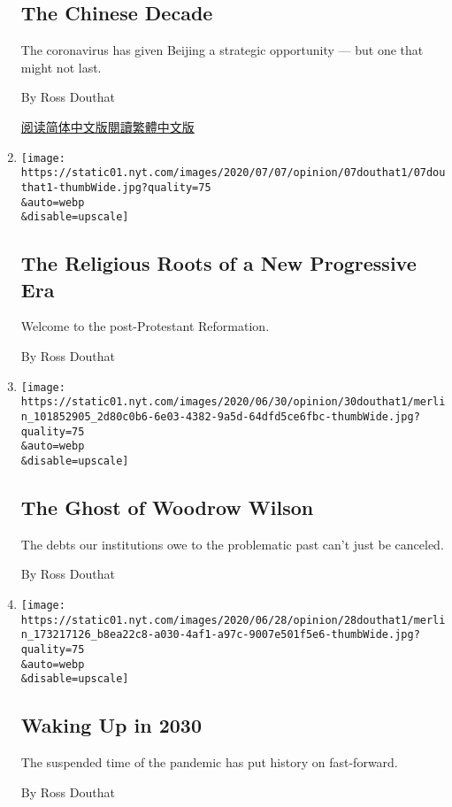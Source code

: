 \begin{enumerate}
{  \subsection{The Chinese Decade}\label{the-chinese-decade}}

  The coronavirus has given Beijing a strategic opportunity --- but one
  that might not last.

  By Ross Douthat

  \href{https://cn.nytimes.com/opinion/20200713/china-coronavirus-power/}{阅读简体中文版}\href{https://cn.nytimes.com/opinion/20200713/china-coronavirus-power/zh-hant/}{閱讀繁體中文版}
\item
  \href{/2020/07/07/opinion/protestant-progressive-reformation.html}{}

  \texttt{[image: https://static01.nyt.com/images/2020/07/07/opinion/07douthat1/07douthat1-thumbWide.jpg?quality=75\\\&auto=webp\\\&disable=upscale]}

  \hypertarget{the-religious-roots-of-a-new-progressive-era}{%
  \subsection{The Religious Roots of a New Progressive
  Era}\label{the-religious-roots-of-a-new-progressive-era}}

  Welcome to the post-Protestant Reformation.

  By Ross Douthat
\item
  \href{/2020/06/30/opinion/woodrow-wilson-princeton.html}{}

  \texttt{[image: https://static01.nyt.com/images/2020/06/30/opinion/30douthat1/merlin\_101852905\_2d80c0b6-6e03-4382-9a5d-64dfd5ce6fbc-thumbWide.jpg?quality=75\\\&auto=webp\\\&disable=upscale]}

  \hypertarget{the-ghost-of-woodrow-wilson}{%
  \subsection{The Ghost of Woodrow
  Wilson}\label{the-ghost-of-woodrow-wilson}}

  The debts our institutions owe to the problematic past can't just be
  canceled.

  By Ross Douthat
\item
  \href{/2020/06/27/opinion/sunday/us-coronavirus-2030.html}{}

  \texttt{[image: https://static01.nyt.com/images/2020/06/28/opinion/28douthat1/merlin\_173217126\_b8ea22c8-a030-4af1-a97c-9007e501f5e6-thumbWide.jpg?quality=75\\\&auto=webp\\\&disable=upscale]}

  \hypertarget{waking-up-in-2030}{%
  \subsection{Waking Up in 2030}\label{waking-up-in-2030}}

  The suspended time of the pandemic has put history on fast-forward.

  By Ross Douthat
\end{enumerate}


